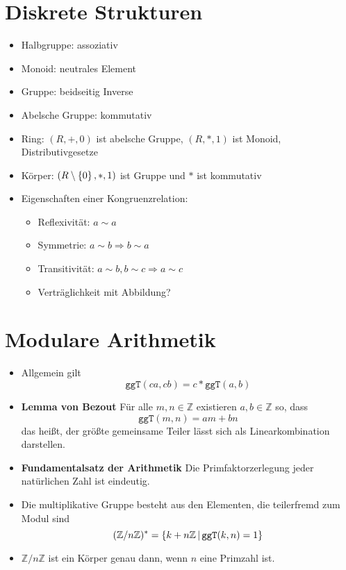 \documentclass[landscape, 8pt, a4paper]{extarticle}
\newcommand{\ggT}{\texttt{ggT}}
\newcommand{\Z}{\mathbb{Z}}
\newcommand{\set}[2]{\ensuremath\left\{ #1 \,\middle|\, #2 \right\}}
\newcommand{\simpleset}[1]{\ensuremath\left\{ #1 \right\}}
\begin{document}
\begin{multicols}{3}
	\section{Diskrete Strukturen}
	\begin{itemize}
		\item Halbgruppe: assoziativ
		\item Monoid: neutrales Element
		\item Gruppe: beidseitig Inverse
		\item Abelsche Gruppe: kommutativ
		\item Ring: $(R,+,0)$ ist abelsche Gruppe, $(R,*,1)$ ist Monoid, Distributivgesetze
		\item Körper: $(R\setminus\simpleset 0, *,1)$ ist Gruppe und $*$ ist kommutativ

		
		\item Eigenschaften einer Kongruenzrelation:%
		\begin{itemize}%
			\item Reflexivität: $a\sim a$
			\item Symmetrie: $a\sim b\Rightarrow b\sim a$
			\item Transitivität: $a\sim b, b\sim c\Rightarrow a\sim c$
			\item {\color{red} Verträglichkeit mit Abbildung?}
		\end{itemize}

	\end{itemize}


	\section{Modulare Arithmetik}
	\begin{itemize}
		\item Allgemein gilt
		\begin{equation*}
			\ggT(ca,cb)=c*\ggT(a,b)
		\end{equation*}
		\item \textbf{Lemma von Bezout}
		Für alle $m,n\in\Z$ existieren $a,b\in\Z$ so, dass
		\begin{equation*}
			\ggT(m,n)=am+bn
		\end{equation*}
		das heißt, der größte gemeinsame Teiler lässt sich als Linearkombination darstellen.
		\item \textbf{Fundamentalsatz der Arithmetik} Die Primfaktorzerlegung jeder natürlichen Zahl ist eindeutig.
		\item Die multiplikative Gruppe besteht aus den Elementen, die teilerfremd zum Modul sind
		\begin{equation*}
			(\Z/n\Z)^\ast =\set{k+n\Z}{\ggT(k,n)=1}
		\end{equation*}
		\item $\Z/n\Z$ ist ein Körper genau dann, wenn $n$ eine Primzahl ist.


\end{itemize}
\end{multicols}
\end{document}
